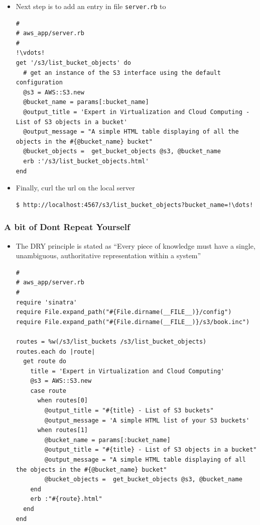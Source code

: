 \documentclass{beamer}
\begin{document}
\begin{frame}
\begin{itemize}
\item Next step is to add an entry in file \texttt{server.rb} to
\lstset{language=Ruby, style=eclipse}
\begin{lstlisting}[escapechar=!]
#
# aws_app/server.rb
#
!\vdots!
get '/s3/list_bucket_objects' do
  # get an instance of the S3 interface using the default configuration
  @s3 = AWS::S3.new
  @bucket_name = params[:bucket_name]
  @output_title = 'Expert in Virtualization and Cloud Computing - List of S3 objects in a bucket'
  @output_message = "A simple HTML table displaying of all the objects in the #{@bucket_name} bucket"
  @bucket_objects =  get_bucket_objects @s3, @bucket_name
  erb :'/s3/list_bucket_objects.html'
end
\end{lstlisting}
\item Finally, curl the url on the local server
\lstset{language=shell}
\begin{lstlisting}[escapechar=!]
  $ http://localhost:4567/s3/list_bucket_objects?bucket_name=!\dots!
\end{lstlisting}

\end{itemize}
\end{frame}

\begin{frame}
\frametitle{A bit of Dont Repeat Yourself}
\begin{itemize}
 \item The DRY principle is stated as ``Every piece of knowledge must have a single, unambiguous, authoritative representation within a system''

\lstset{language=Ruby, style=eclipse}
\begin{lstlisting}[escapechar=!]
#
# aws_app/server.rb
#
require 'sinatra'
require File.expand_path("#{File.dirname(__FILE__)}/config")
require File.expand_path("#{File.dirname(__FILE__)}/s3/book.inc")

routes = %w(/s3/list_buckets /s3/list_bucket_objects)
routes.each do |route|
  get route do
    title = 'Expert in Virtualization and Cloud Computing'
    @s3 = AWS::S3.new
    case route
      when routes[0]
        @output_title = "#{title} - List of S3 buckets"
        @output_message = 'A simple HTML list of your S3 buckets'
      when routes[1]
        @bucket_name = params[:bucket_name]
        @output_title = "#{title} - List of S3 objects in a bucket"
        @output_message = "A simple HTML table displaying of all the objects in the #{@bucket_name} bucket"
        @bucket_objects =  get_bucket_objects @s3, @bucket_name
    end
    erb :"#{route}.html"
  end
end
\end{lstlisting}
\end{itemize}

\end{frame}
\end{document}
